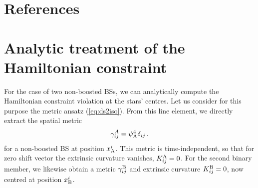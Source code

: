 \documentclass[]{iopart}
\begin{document}
\section*{References}
%



\appendix

\section{Analytic treatment of the Hamiltonian constraint}
\label{sec:hamanalytic}
For the case of two non-boosted BSs, we can analytically
compute the Hamiltonian constraint violation
at the stars' centres. Let us consider for this purpose
the metric ansatz (\ref{eq:ds2iso}). From this line
element, we directly extract the spatial metric
%
%
\begin{equation}
    \gamma_{ij}^{A} = \psi_{\rm A}^4 \delta_{ij}\,.\label{eqn:appendixansatzmetric}
\end{equation}
%
for a non-boosted BS at position $x_{\rm A}^i$.
This metric is time-independent,
so that for zero shift vector the extrinsic curvature vanishes,
%
$K_{ij}^{\rm A} = 0$. 
%
For the second binary member, we likewise obtain a
metric $\gamma^{\rm B}_{ij}$ and extrinsic curvature
$K^{\rm B}_{ij}=0$, now centred at position $x_{\rm B}^i$.
\end{document}
